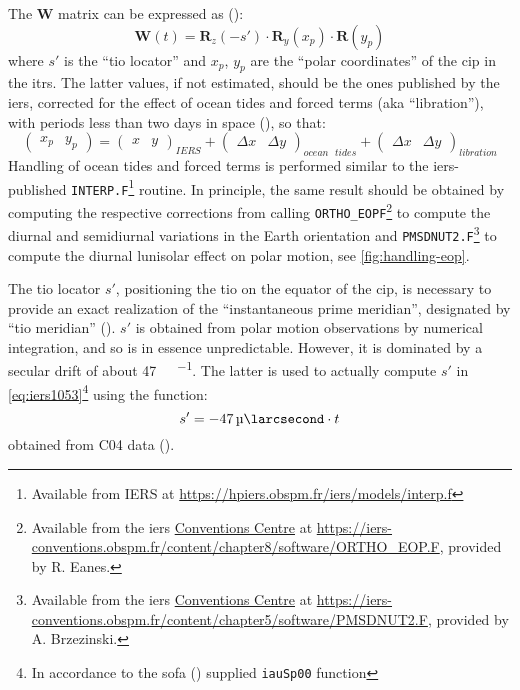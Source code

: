 The $\bm{W}$ matrix can be expressed as (\cite{iers2010}):
\begin{equation}
    \bm{W}(t) = \bm{R}_z(-s') \cdot \bm{R}_y(x_p) \cdot \bm{R}(y_p)
    \label{eq:iers1053}
\end{equation}
where $s'$ is the ``\gls{tio} locator'' and $x_p$, $y_p$ are the 
``polar coordinates'' of the \gls{cip} in the \gls{itrs}. The latter values, 
if not estimated, should be the ones published by the \gls{iers}, corrected for 
the effect of ocean tides and forced terms (aka ``libration''), with periods 
less than two days in space (\cite{iers2010}), so that:
\begin{equation}
    \begin{pmatrix} x_p & y_p \end{pmatrix} = 
    \begin{pmatrix} x & y \end{pmatrix}_{IERS} + 
    \begin{pmatrix} \Delta x & \Delta y \end{pmatrix}_{ocean\text{ }tides} + 
    \begin{pmatrix} \Delta x & \Delta y \end{pmatrix}_{libration} 
\end{equation}
Handling of ocean tides and forced terms is performed similar to the \gls{iers}-published 
\texttt{INTERP.F}\footnote{Available from IERS at \url{https://hpiers.obspm.fr/iers/models/interp.f}} routine. 
In principle, the same result should be obtained by computing the respective 
corrections from calling \texttt{ORTHO\_EOPF}\footnote{Available from the \gls{iers} \href{https://iers-conventions.obspm.fr/}{Conventions Centre} at \url{https://iers-conventions.obspm.fr/content/chapter8/software/ORTHO_EOP.F}, provided by R. Eanes.} 
to compute the diurnal and semidiurnal variations in the Earth orientation
and \texttt{PMSDNUT2.F}\footnote{Available from the \gls{iers} \href{https://iers-conventions.obspm.fr/}{Conventions Centre} at \url{https://iers-conventions.obspm.fr/content/chapter5/software/PMSDNUT2.F}, provided by A. Brzezinski.}
to compute the diurnal lunisolar effect on polar motion, see \ref{fig:handling-eop}.

The \gls{tio} locator $s'$, positioning the \gls{tio} on the equator of the \gls{cip}, 
is necessary to provide an exact realization of the ``instantaneous prime meridian'', 
designated by ``\gls{tio} meridian'' (\cite{iers2010}). $s'$ is obtained from 
polar motion observations by numerical integration, and so is in essence 
unpredictable. However, it is dominated by a secular drift of about 
\SI{47}{\micro\larcsecond \per \century}. The latter is used to actually compute 
$s'$ in \ref{eq:iers1053}\footnote{In accordance to the \gls{sofa} (\cite{SOFA20210125}) supplied \texttt{iauSp00} function} 
using the function:
\begin{equation}
  s' = \SI{-47}{\micro\larcsecond} \cdot t
  \label{eq:iers10513}
\end{equation}
obtained from C04 data (\cite{Lambert_2002}).

